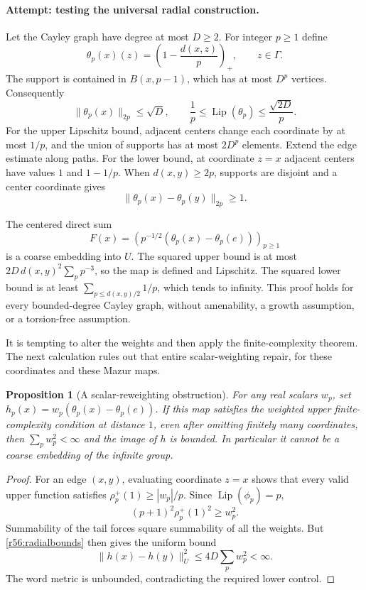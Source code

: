 \documentclass[11pt,a4paper]{article}
\newtheorem{notebookproposition}[notebooklemma]{Proposition}
\numberwithin{equation}{section}
\begin{document}
\paragraph{Attempt: testing the universal radial construction.}
Let the Cayley graph have degree at most $D\geq2$. For integer $p\geq1$ define
\[
 \theta_p(x)(z)=\left(1-\frac{d(x,z)}p\right)_+,
 \qquad z\in\Gamma.
\]
The support is contained in $B(x,p-1)$, which has at most $D^p$ vertices. Consequently
\begin{equation}\label{r56:radialbounds}
 \|\theta_p(x)\|_{2p}\leq\sqrt D,\qquad
 \frac1p\leq\operatorname{Lip}(\theta_p)
                   \leq\frac{\sqrt{2D}}p.
\end{equation}
For the upper Lipschitz bound, adjacent centers change each coordinate by at most $1/p$, and the union of supports has at most $2D^p$ elements. Extend the edge estimate along paths. For the lower bound, at coordinate $z=x$ adjacent centers have values $1$ and $1-1/p$. When $d(x,y)\geq2p$, supports are disjoint and a center coordinate gives
\begin{equation}\label{r56:separation}
 \|\theta_p(x)-\theta_p(y)\|_{2p}\geq1.
\end{equation}

The centered direct sum
\[
 F(x)=\left(p^{-1/2}(\theta_p(x)-\theta_p(e))\right)_{p\geq1}
\]
is a coarse embedding into $U$. The squared upper bound is at most
$2D\,d(x,y)^2\sum_pp^{-3}$, so the map is defined and Lipschitz. The squared lower bound is at least
$\sum_{p\leq d(x,y)/2}1/p$, which tends to infinity. This proof holds for every bounded-degree Cayley graph, without amenability, a growth assumption, or a torsion-free assumption.

It is tempting to alter the weights and then apply the finite-complexity theorem. The next calculation rules out that entire scalar-weighting repair, for these coordinates and these Mazur maps.

\begin{notebookproposition}[A scalar-reweighting obstruction]\label{r56:obstruction}
For any real scalars $w_p$, set
$h_p(x)=w_p(\theta_p(x)-\theta_p(e))$. If this map satisfies the weighted upper finite-complexity condition at distance $1$, even after omitting finitely many coordinates, then $\sum_pw_p^2<\infty$ and the image of $h$ is bounded. In particular it cannot be a coarse embedding of the infinite group.
\end{notebookproposition}
\begin{proof}
For an edge $(x,y)$, evaluating coordinate $z=x$ shows that every valid upper function satisfies $\rho_p^+(1)\geq|w_p|/p$. Since $\operatorname{Lip}(\phi_p)=p$,
\[
 (p+1)^2\rho_p^+(1)^2\geq w_p^2.
\]
Summability of the tail forces square summability of all the weights. But \eqref{r56:radialbounds} then gives the uniform bound
\[
 \|h(x)-h(y)\|_U^2\leq4D\sum_pw_p^2<\infty.
\]
The word metric is unbounded, contradicting the required lower control.
\end{proof}
\end{document}
